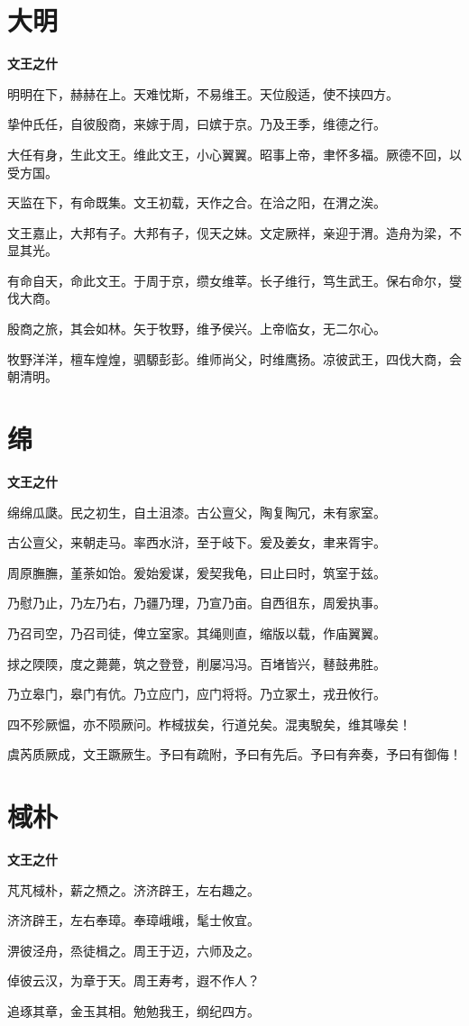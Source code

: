 \documentclass[12pt,a4paper]{ctexbook}
\begin{document}
\section{大明}
\textbf{文王之什}\par\vspace{0.5em}
明明在下，赫赫在上。天难忱斯，不易维王。天位殷适，使不挟四方。\par
挚仲氏任，自彼殷商，来嫁于周，曰嫔于京。乃及王季，维德之行。\par
大任有身，生此文王。维此文王，小心翼翼。昭事上帝，聿怀多福。厥德不回，以受方国。\par
天监在下，有命既集。文王初载，天作之合。在洽之阳，在渭之涘。\par
文王嘉止，大邦有子。大邦有子，伣天之妹。文定厥祥，亲迎于渭。造舟为梁，不显其光。\par
有命自天，命此文王。于周于京，缵女维莘。长子维行，笃生武王。保右命尔，燮伐大商。\par
殷商之旅，其会如林。矢于牧野，维予侯兴。上帝临女，无二尔心。\par
牧野洋洋，檀车煌煌，驷騵彭彭。维师尚父，时维鹰扬。凉彼武王，四伐大商，会朝清明。\par

\section{绵}
\textbf{文王之什}\par\vspace{0.5em}
绵绵瓜瓞。民之初生，自土沮漆。古公亶父，陶复陶冗，未有家室。\par
古公亶父，来朝走马。率西水浒，至于岐下。爰及姜女，聿来胥宇。\par
周原膴膴，堇荼如饴。爰始爰谋，爰契我龟，曰止曰时，筑室于兹。\par
乃慰乃止，乃左乃右，乃疆乃理，乃宣乃亩。自西徂东，周爰执事。\par
乃召司空，乃召司徒，俾立室家。其绳则直，缩版以载，作庙翼翼。\par
捄之陾陾，度之薨薨，筑之登登，削屡冯冯。百堵皆兴，鼛鼓弗胜。\par
乃立皋门，皋门有伉。乃立应门，应门将将。乃立冢土，戎丑攸行。\par
四不殄厥愠，亦不陨厥问。柞棫拔矣，行道兑矣。混夷駾矣，维其喙矣！\par
虞芮质厥成，文王蹶厥生。予曰有疏附，予曰有先后。予曰有奔奏，予曰有御侮！\par

\section{棫朴}
\textbf{文王之什}\par\vspace{0.5em}
芃芃棫朴，薪之槱之。济济辟王，左右趣之。\par
济济辟王，左右奉璋。奉璋峨峨，髦士攸宜。\par
淠彼泾舟，烝徒楫之。周王于迈，六师及之。\par
倬彼云汉，为章于天。周王寿考，遐不作人？\par
追琢其章，金玉其相。勉勉我王，纲纪四方。\par
\end{document}
